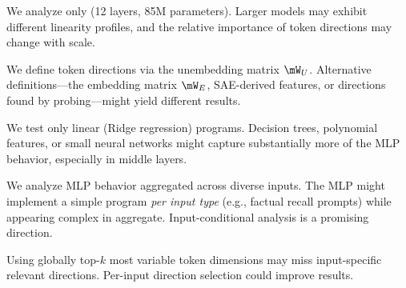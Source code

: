 We analyze only \gpttwo (12 layers, 85M parameters).
Larger models may exhibit different linearity profiles, and the relative importance of token directions may change with scale.

We define token directions via the unembedding matrix $\Wu$.
Alternative definitions---the embedding matrix $\mW_E$, SAE-derived features, or directions found by probing---might yield different results.

We test only linear (Ridge regression) programs.
Decision trees, polynomial features, or small neural networks might capture substantially more of the MLP behavior, especially in middle layers.

We analyze MLP behavior aggregated across diverse inputs.
The MLP might implement a simple program \emph{per input type} (e.g., factual recall prompts) while appearing complex in aggregate.
Input-conditional analysis is a promising direction.

Using globally top-$k$ most variable token dimensions may miss input-specific relevant directions.
Per-input direction selection could improve results.
